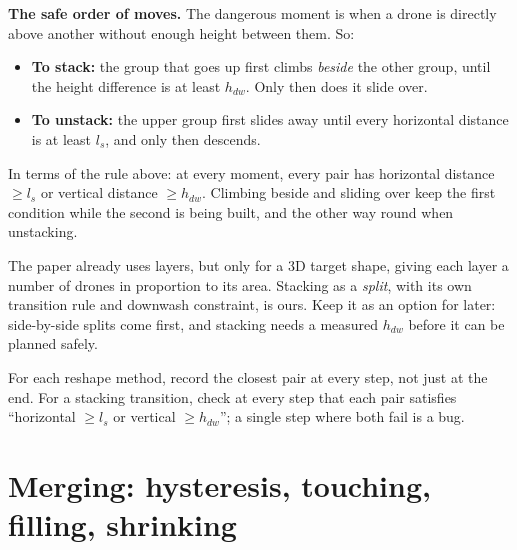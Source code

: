 \documentclass[11pt,a4paper]{article}
\begin{document}
\textbf{The safe order of moves.} The dangerous moment is when a drone is directly above another without enough
height between them. So:
\begin{itemize}[leftmargin=*]
\item \textbf{To stack:} the group that goes up first climbs \emph{beside} the other group, until the height
difference is at least $h_{dw}$. Only then does it slide over.
\item \textbf{To unstack:} the upper group first slides away until every horizontal distance is at least $l_s$, and
only then descends.
\end{itemize}
In terms of the rule above: at every moment, every pair has horizontal distance $\ge l_s$ or vertical distance
$\ge h_{dw}$. Climbing beside and sliding over keep the first condition while the second is being built, and the
other way round when unstacking.

\begin{plainbox}
The paper already uses layers, but only for a 3D target shape, giving each layer a number of drones in proportion to
its area. Stacking as a \emph{split}, with its own transition rule and downwash constraint, is ours. Keep it as an
option for later: side-by-side splits come first, and stacking needs a measured $h_{dw}$ before it can be planned
safely.
\end{plainbox}

\begin{testbox}
For each reshape method, record the closest pair at every step, not just at the end. For a stacking transition,
check at every step that each pair satisfies ``horizontal $\ge l_s$ or vertical $\ge h_{dw}$''; a single step where
both fail is a bug.
\end{testbox}

\section{Merging: hysteresis, touching, filling, shrinking}\label{sec:merge}
\end{document}
